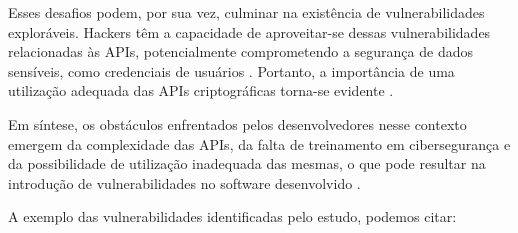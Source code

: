 Esses desafios podem, por sua vez, culminar na existência de vulnerabilidades exploráveis. Hackers têm a capacidade de aproveitar-se dessas vulnerabilidades relacionadas às APIs, potencialmente comprometendo a segurança de dados sensíveis, como credenciais de usuários \cite{api_misuses_zhang}. Portanto, a importância de uma utilização adequada das APIs criptográficas torna-se evidente \cite{api_misuses_zhang}.

Em síntese, os obstáculos enfrentados pelos desenvolvedores nesse contexto emergem da complexidade das APIs, da falta de treinamento em cibersegurança e da possibilidade de utilização inadequada das mesmas, o que pode resultar na introdução de vulnerabilidades no software desenvolvido \cite{api_misuses_zhang}.



A exemplo das vulnerabilidades identificadas pelo estudo, podemos citar:

